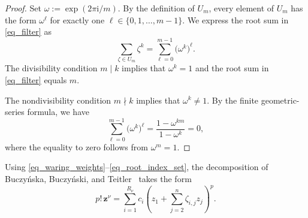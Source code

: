 \documentclass[final,oneeqnum]{siamltex}
\newcommand{\bz}{\bm{z}}
\begin{document}
\begin{proof}
    Set $\omega := \exp(2 \pi \mathrm{i} / m)$.
    By the definition of $U_m$, every element of $U_m$ has the form $\omega^{\ell}$ for exactly one $\ell \in \{0, 1, \ldots, m - 1\}$.
    We express the root sum in \eqref{eq_filter} as
    \begin{equation*}
        \sum_{\zeta \in U_{m}} \zeta^{k} = \sum_{\ell = 0}^{m - 1} \bigl(\omega^{k}\bigr)^{\ell}.
    \end{equation*}
    The divisibility condition $m \mid k$ implies that $\omega^{k} = 1$ and the root sum in \eqref{eq_filter} equals $m$.

    The nondivisibility condition $m \nmid k$ implies that $\omega^{k} \ne 1$.
    By the finite geometric-series formula, we have
    \begin{equation*}
        \sum_{\ell = 0}^{m - 1} \bigl(\omega^{k}\bigr)^{\ell} = \frac{1 - \omega^{k m}}{1 - \omega^{k}} = 0,
    \end{equation*}
    where the equality to zero follows from $\omega^{m} = 1$.
\end{proof}

Using \eqref{eq_waring_weights}--\eqref{eq_root_index_set}, the decomposition of Buczyńska, Buczyński, and Teitler~\cite[Sec.~2, Eq.~(8)]{BBT2013} takes the form
\begin{equation}\label{eq_scaled_waring}
    p! \, \bz^\nu = \sum_{i = 1}^{R_\nu} c_i \left(z_1 + \sum_{j = 2}^{n} \zeta_{i, j} z_j\right)^p.
\end{equation}
\end{document}
